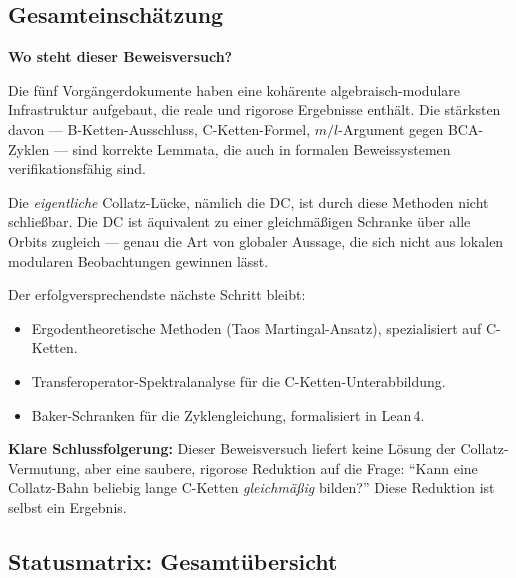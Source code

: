 \documentclass[12pt,a4paper]{article}
\begin{document}
\subsection{Gesamteinschätzung}

\begin{tcolorbox}[kernidee]
\textbf{Wo steht dieser Beweisversuch?}

Die fünf Vorgängerdokumente haben eine kohärente algebraisch-modulare
Infrastruktur aufgebaut, die reale und rigorose Ergebnisse enthält.
Die stärksten davon --- B-Ketten-Ausschluss, C-Ketten-Formel,
$m/l$-Argument gegen B\textbullet C\textbullet A-Zyklen --- sind
korrekte Lemmata, die auch in formalen Beweissystemen verifikationsfähig sind.

Die \emph{eigentliche} Collatz-Lücke, nämlich die DC, ist durch diese
Methoden nicht schließbar. Die DC ist äquivalent zu einer gleichmäßigen
Schranke über alle Orbits zugleich --- genau die Art von globaler
Aussage, die sich nicht aus lokalen modularen Beobachtungen gewinnen lässt.

Der erfolgversprechendste nächste Schritt bleibt:
\begin{itemize}
  \item Ergodentheoretische Methoden (Taos Martingal-Ansatz),
    spezialisiert auf C-Ketten.
  \item Transferoperator-Spektralanalyse für die C-Ketten-Unterabbildung.
  \item Baker-Schranken für die Zyklengleichung, formalisiert in Lean\,4.
\end{itemize}

\textbf{Klare Schlussfolgerung:} Dieser Beweisversuch liefert keine
Lösung der Collatz-Vermutung, aber eine saubere, rigorose Reduktion
auf die Frage: ``Kann eine Collatz-Bahn beliebig lange C-Ketten
\emph{gleichmäßig} bilden?'' Diese Reduktion ist selbst ein Ergebnis.
\end{tcolorbox}

\subsection{Statusmatrix: Gesamtübersicht}
\end{document}
